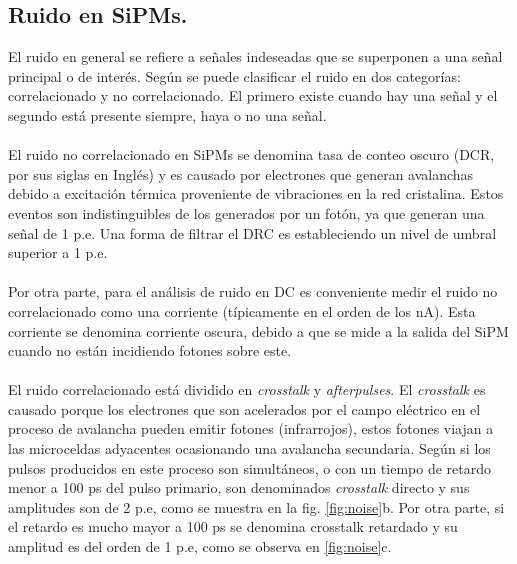 \subsection{Ruido en SiPMs.}
El ruido en general se refiere a señales indeseadas que se superponen a una señal principal o de interés. Según \citep{tomasi} se puede clasificar el ruido en dos categorías: correlacionado y no correlacionado. El primero existe cuando hay una señal y el segundo está presente siempre, haya o no una señal.\\ \\
El ruido no correlacionado en SiPMs se denomina tasa de conteo oscuro (DCR, por sus siglas en Inglés) y es causado por electrones que generan avalanchas debido a excitación térmica proveniente de vibraciones en la red cristalina. Estos eventos son indistinguibles de los generados por un fotón, ya que generan una señal de 1 p.e. Una forma de filtrar el DRC es estableciendo un nivel de umbral superior a 1 p.e.\\ \\
Por otra parte, para el análisis de ruido en DC es conveniente medir el ruido no correlacionado como una corriente (típicamente en el orden de los nA). Esta corriente se denomina corriente oscura, debido a que se mide a la salida del SiPM cuando no están incidiendo fotones sobre este.\\ \\
El ruido correlacionado está dividido en \textit{crosstalk} y \textit{afterpulses}. El \textit{crosstalk} es causado porque los electrones que  son acelerados por el campo eléctrico en el proceso de avalancha pueden emitir fotones (infrarrojos), estos fotones viajan a las microceldas adyacentes ocasionando una avalancha secundaria. Según \citep{charct_noise} si los pulsos producidos en este proceso son simultáneos, o con un tiempo de retardo menor a 100 ps del pulso primario, son denominados \textit{crosstalk} directo y sus amplitudes son de 2 p.e, como se muestra en la fig. \ref{fig:noise}b. Por otra parte, si el retardo es mucho mayor a 100 ps se denomina  {crosstalk} retardado y su amplitud es del orden de 1 p.e, como se observa en \ref{fig:noise}c. 
